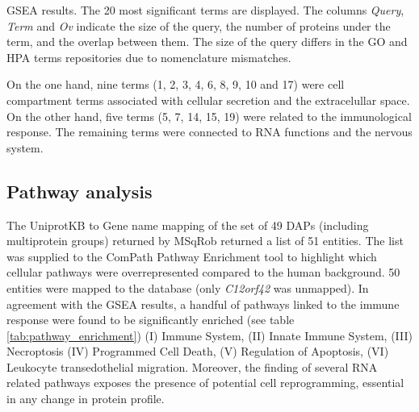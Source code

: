 \begin{table}[!h]
\caption{\ac{GSEA} results. The 20 most significant terms are displayed. The columns \textit{Query}, \textit{Term} and \textit{Ov} indicate the size of the query, the number of proteins under the term, and the overlap between them. The size of the query differs in the GO and HPA terms repositories due to nomenclature mismatches.}
\label{tab:gsea}
\end{table}
\normalsize

On the one hand, nine terms (1, 2, 3, 4, 6, 8, 9, 10 and 17) were cell compartment terms associated with cellular secretion and the extracelullar space. On the other hand, five terms (5, 7, 14, 15, 19) were related to the immunological response. The remaining terms were connected to RNA functions and the nervous system.

\subsection{Pathway analysis}

The UniprotKB to Gene name mapping of the set of 49 \ac{DAP}s (including multiprotein groups) returned by MSqRob returned a list of 51 entities. The list was supplied to the ComPath Pathway Enrichment tool to highlight which cellular pathways were overrepresented compared to the human background. 50 entities were mapped to the database (only \textit{C12orf42} was unmapped). In agreement with the \ac{GSEA} results, a handful of pathways linked to the immune response were found to be significantly enriched (see table \ref{tab:pathway_enrichment}) (I) Immune System, (II) Innate Immune System, (III) Necroptosis (IV) Programmed Cell Death, (V) Regulation of Apoptosis, (VI) Leukocyte transedothelial migration. Moreover, the finding of several RNA related pathways exposes the presence of potential cell reprogramming, essential in any change in protein profile.

